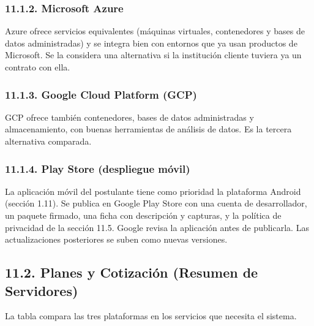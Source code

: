 \subsubsection{11.1.2. Microsoft Azure}

Azure ofrece servicios equivalentes (máquinas virtuales, contenedores y bases de datos administradas) y se integra bien con entornos que ya usan productos de Microsoft. Se la considera una alternativa si la institución cliente tuviera ya un contrato con ella.

\subsubsection{11.1.3. Google Cloud Platform (GCP)}

GCP ofrece también contenedores, bases de datos administradas y almacenamiento, con buenas herramientas de análisis de datos. Es la tercera alternativa comparada.

\subsubsection{11.1.4. Play Store (despliegue móvil)}

La aplicación móvil del postulante tiene como prioridad la plataforma Android (sección 1.11). Se publica en Google Play Store con una cuenta de desarrollador, un paquete firmado, una ficha con descripción y capturas, y la política de privacidad de la sección 11.5. Google revisa la aplicación antes de publicarla. Las actualizaciones posteriores se suben como nuevas versiones.

\subsection{11.2. Planes y Cotización (Resumen de Servidores)}

La tabla compara las tres plataformas en los servicios que necesita el sistema.

